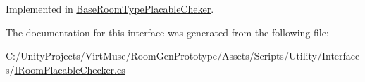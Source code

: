 Implemented in \mbox{\hyperlink{class_base_room_type_placable_cheker_a1081710d512b5f2496d390ece6cdbadd}{Base\+Room\+Type\+Placable\+Cheker}}.



The documentation for this interface was generated from the following file\+:\begin{DoxyCompactItemize}
\item 
C\+:/\+Unity\+Projects/\+Virt\+Muse/\+Room\+Gen\+Prototype/\+Assets/\+Scripts/\+Utility/\+Interfaces/\mbox{\hyperlink{_i_room_placable_checker_8cs}{I\+Room\+Placable\+Checker.\+cs}}\end{DoxyCompactItemize}
